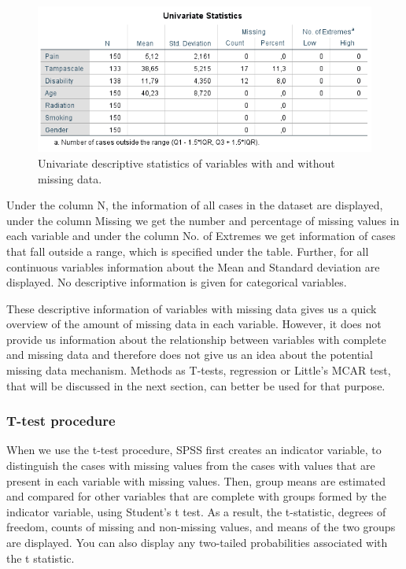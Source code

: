 \documentclass[]{book}
\theoremstyle{definition}
\theoremstyle{definition}
\theoremstyle{definition}
\theoremstyle{remark}
\begin{document}
\begin{figure}

{\centering \includegraphics[width=0.9\linewidth]{images/tab2.4} 

}

\caption{Univariate descriptive statistics of variables with and without missing data.}\label{fig:tab2-4}
\end{figure}

Under the column N, the information of all cases in the dataset are
displayed, under the column Missing we get the number and percentage of
missing values in each variable and under the column No. of Extremes we
get information of cases that fall outside a range, which is specified
under the table. Further, for all continuous variables information about
the Mean and Standard deviation are displayed. No descriptive
information is given for categorical variables.

These descriptive information of variables with missing data gives us a
quick overview of the amount of missing data in each variable. However,
it does not provide us information about the relationship between
variables with complete and missing data and therefore does not give us
an idea about the potential missing data mechanism. Methods as T-tests,
regression or Little's MCAR test, that will be discussed in the next
section, can better be used for that purpose.

\subsubsection{T-test procedure}\label{t-test-procedure}

When we use the t-test procedure, SPSS first creates an indicator
variable, to distinguish the cases with missing values from the cases
with values that are present in each variable with missing values. Then,
group means are estimated and compared for other variables that are
complete with groups formed by the indicator variable, using Student's t
test. As a result, the t-statistic, degrees of freedom, counts of
missing and non-missing values, and means of the two groups are
displayed. You can also display any two-tailed probabilities associated
with the t statistic.
\end{document}
